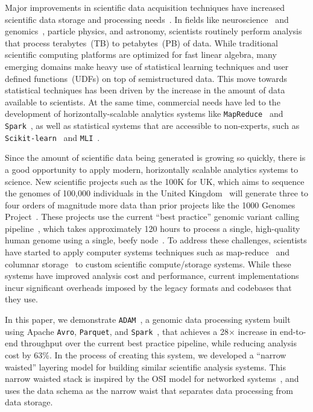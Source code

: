\documentclass{acm_proc_article-sp}
\begin{document}
Major improvements in scientific data acquisition techniques have increased scientific data storage and
processing \linebreak needs~\cite{cunningham14, schadt10}. In fields like
neuroscience~\cite{freeman14} and \linebreak genomics~\cite{stein10}, particle physics, and astronomy,
scientists routinely perform analysis that process terabytes~(TB) to \linebreak petabytes~(PB) of data.
While traditional scientific computing platforms are optimized for fast linear algebra, many emerging
domains make heavy use of statistical learning techniques and user defined functions~(UDFs) on top of
semistructured data. This move towards statistical techniques has been driven by the increase in the
amount of data available to scientists. At the same time, commercial needs have led to the development of
horizontally-scalable analytics systems like \texttt{MapReduce}~\cite{dean04, dean08} and
\texttt{Spark}~\cite{zaharia10}, as well as statistical systems that are accessible to non-experts, such as
\texttt{Scikit-learn}~\cite{pedregosa11} and \texttt{MLI}~\cite{sparks13}.

Since the amount of scientific data being generated is growing so quickly, there is a good opportunity to apply
modern, horizontally scalable analytics systems to science. New scientific
projects such as the 100K for UK, which aims to sequence the genomes of 100,000 individuals in the
United Kingdom~\cite{uk100k} will generate three to four orders of magnitude more data than
prior projects like the 1000 Genomes Project~\cite{siva08}. These projects use the current ``best
practice'' genomic variant calling pipeline~\cite{auwera13}, which takes approximately 120 hours to
process a single, high-quality human genome using a single, beefy node~\cite{talwalkar14}. To address
these challenges, scientists have started to apply computer systems techniques such as
map-reduce~\cite{langmead09, mckenna10, schatz09} and columnar storage~\cite{fritz11} to custom
scientific compute/storage systems. While these systems have improved analysis cost and performance,
current implementations incur significant overheads imposed by the legacy formats and
codebases that they use.

In this paper, we demonstrate \texttt{ADAM}~\cite{massie13}, a genomic data processing system built using Apache
\texttt{Avro}, \texttt{Parquet}, and \texttt{Spark}~\cite{avro, parquet, zaharia10}, that achieves a 28$\times$
increase in end-to-end throughput over the current best
practice pipeline, while reducing analysis cost by 63\%. In the process of creating this
system, we developed a ``narrow waisted'' layering model for building similar scientific analysis systems.
This narrow waisted stack is inspired by the OSI model for networked systems~\cite{zimmermann80}, and
uses the data schema as the narrow waist that separates data processing from data storage.
\end{document}
